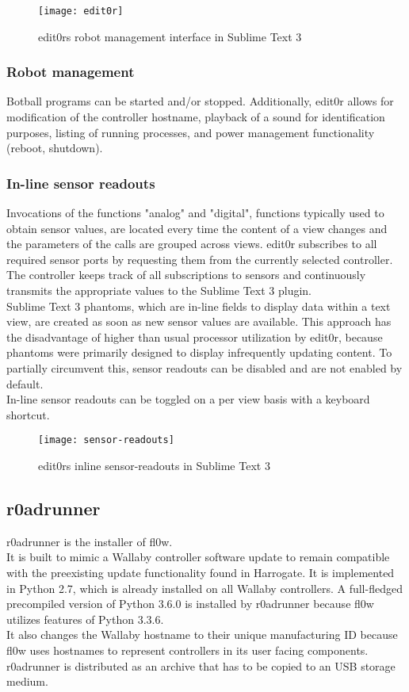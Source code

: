 \documentclass[conference,a4paper]{IEEEtran}
\begin{document}
\begin{figure}[H]
\centering
\texttt{[image: edit0r]}
\caption{edit0rs robot management interface in Sublime Text 3}
\label{fig:robot_management}
\end{figure}

\subsubsection{Robot management}
Botball programs can be started and/or stopped.
Additionally, edit0r allows for modification of the controller hostname, playback of a sound for identification purposes, listing of running processes, and power management functionality (reboot, shutdown).\\

\subsubsection{In-line sensor readouts}
Invocations of the functions "analog" and "digital", functions typically used to obtain sensor values, are located every time the content of a view changes and the parameters of the calls are grouped across views. edit0r subscribes to all required sensor ports by requesting them from the currently selected controller. The controller keeps track of all subscriptions to sensors and continuously transmits the appropriate values to the Sublime Text 3 plugin. \\Sublime Text 3 phantoms, which are in-line fields to display data within a text view, are created as soon as new sensor values are available. This approach has the disadvantage of higher than usual processor utilization by edit0r, because phantoms were primarily designed to display infrequently updating content. To partially circumvent this, sensor readouts can be disabled and are not enabled by default.\\
In-line sensor readouts can be toggled on a per view basis with a keyboard shortcut.\\

\begin{figure}[H]
\centering
\texttt{[image: sensor-readouts]}
\caption{edit0rs inline sensor-readouts in Sublime Text 3}
\label{fig:inline_sensor_readouts}
\end{figure}


\subsection{r0adrunner}
r0adrunner is the installer of fl0w. \\It is built to mimic a Wallaby controller software update to remain compatible with the preexisting update functionality found in Harrogate. It is implemented in Python 2.7, which is already installed on all Wallaby controllers. A full-fledged precompiled version of Python 3.6.0 is installed by r0adrunner because fl0w utilizes features of Python 3.3.6. \\It also changes the Wallaby hostname to their unique manufacturing ID because fl0w uses hostnames to represent controllers in its user facing components. r0adrunner is distributed as an archive that has to be copied to an USB storage medium.
\end{document}
